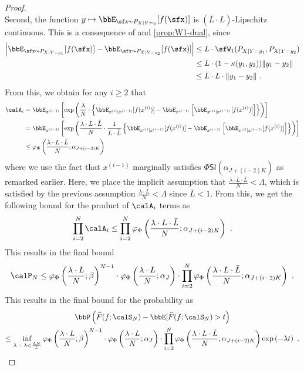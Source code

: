 \documentclass[11pt]{article}
\newcounter{ct}
\newcommand{\PhiSI}[1]{\Phi\mathsf{SI}\left(#1\right)}
\begin{document}
\begin{proof}
\begin{equation*}
\end{equation*}
Second, the function \(y \mapsto \bbE_{\sfx \sim P_{X | Y  =y}}[f(\sfx)]\) is \((\bar{L} \cdot L)\)-Lipschitz continuous.
This is a consequence of  and \cref{prop:W1-dual}, since
\begin{align*}
    \left|\bbE_{\sfx \sim P_{X | Y = y_{1}}}[f(\sfx)] - \bbE_{\sfx \sim P_{X | Y = y_{2}}}[f(\sfx)]\right| &\leq L \cdot \sfW_{1}(P_{X | Y = y_{1}}, P_{X | Y = y_{2}}) \\
    &\leq L \cdot (1 - \kappa(y_{1}, y_{2})) \|y_{1} - y_{2}\| \\
    &\leq \bar{L} \cdot L \cdot \|y_{1} - y_{2}\|~.
\end{align*}
From this, we obtain for any \(i \geq 2\) that
\begin{align*}
    \calA_{i} &= \bbE_{x^{(i - 1)}}\left[\exp\left(\frac{\lambda}{N} \cdot \left\{\bbE_{x^{(i)} | x^{(i - 1)}}[f(x^{(i)})] - \bbE_{x^{(i - 1)}}\left[\bbE_{x^{(i)} | x^{(i - 1)}}[f(x^{(i)})]\right]\right\}\right)\right] \\
    &= \bbE_{x^{(i - 1)}}\left[\exp\left(\frac{\lambda \cdot L \cdot \bar{L}}{N} \cdot \frac{1}{L \cdot \bar{L}} \left\{\bbE_{x^{(i)} | x^{(i - 1)}}[f(x^{(i)})] - \bbE_{x^{(i - 1)}}\left[\bbE_{x^{(i)} | x^{(i - 1)}}[f(x^{(i)})]\right]\right\}\right)\right] \\
    &\leq \varphi_{\Phi}\left(\frac{\lambda \cdot L \cdot \bar{L}}{N}; \alpha_{J + (i - 2)K}\right)
\end{align*}
where we use the fact that \(x^{(i -1)}\) marginally satisfies \(\PhiSI{\alpha_{J + (i - 2)K}}\) as remarked earlier.
Here, we place the implicit assumption that \(\frac{\lambda \cdot L \cdot \bar{L}}{N} < \Lambda\), which is satisfied by the previous assumption \(\frac{\lambda \cdot L}{N} < \Lambda\) since \(\bar{L} < 1\).
From this, we get the following bound for the product of \(\calA_{i}\) terms as
\begin{equation*}
    \prod_{i=2}^{N} \calA_{i} \leq \prod_{i=2}^{N} \varphi_{\Phi}\left(\frac{\lambda \cdot L \cdot \bar{L}}{N}; \alpha_{J + (i - 2)K}\right)~.
\end{equation*}
This results in the final bound
\begin{equation*}
    \calP_{N} \leq \varphi_{\Phi}\left(\frac{\lambda \cdot L}{N}; \beta\right)^{N - 1} \cdot \varphi_{\Phi}\left(\frac{\lambda \cdot L}{N}; \alpha_{J}\right) \cdot \prod_{i=2}^{N} \varphi_{\Phi}\left(\frac{\lambda \cdot L \cdot \bar{L}}{N}; \alpha_{J + (i -2)K}\right)~.
\end{equation*}
This results in the final bound for the probability as
\begin{multline*}
    \bbP\left(\widehat{F}(f; \calS_{N}) - \bbE[\widehat{F}(f; \calS_{N}) > t\right) \\\leq \inf_{\lambda ~:~ \lambda < \frac{\Lambda N}{L}} \varphi_{\Phi}\left(\frac{\lambda \cdot L}{N}; \beta\right)^{N - 1} \cdot \varphi_{\Phi}\left(\frac{\lambda \cdot L}{N}; \alpha_{J}\right) \cdot \prod_{i=2}^{N} \varphi_{\Phi}\left(\frac{\lambda \cdot L \cdot \bar{L}}{N}; \alpha_{J + (i -2)K}\right) \exp\left(-\lambda t\right)~.
\end{multline*}


\end{proof}
\end{document}
